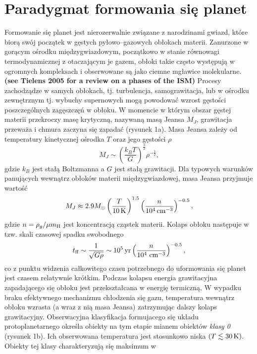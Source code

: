 \section{Paradygmat formowania się planet}
Formowanie się planet jest nierozerwalnie związane z narodzinami gwiazd, które
biorą swój początek w gęstych pyłowo--gazowych obłokach materii. Zanurzone w
gorącym ośrodku międzygwiazdowym, początkowo w stanie równowagi termodynamicznej
z otaczającym je gazem, obłoki takie często występują w
ogromnych kompleksach i obserwowane są jako ciemne mgławice molekularne. {\bf
(see Tielens 2005 for a review on a phases of the ISM)} Procesy zachodządze w
samych obłokach, tj. turbulencja, samograwitacja, lub w ośrodku zewnętrznym tj.
wybuchy supernowych mogą powodować wzrost gęstości poszczególnych zagęszczęń w
obłoku. W momencie w którym obszar gęstej materii przekroczy  masę krytyczną,
nazywaną masą Jeansa $M_J$, grawitacja przeważa i chmura zaczyna się zapadać
(rysunek 1a). Masa Jeansa zależy od temperatury kinetycznej ośrodka $T$ oraz
jego gęstości $\rho$ \begin{equation} M_J \sim \left( \frac{k_B T}{G} \right)
^\frac{3}{2} {\rho}^{-\frac{1}{2}}, \end{equation} gdzie $k_B$ jest stałą
Boltzmanna a $G$ jest stałą grawitacji. Dla typowych warunków panujących
wewnątrz obłoków materii międzygwiazdowej, masa Jeansa przyjmuje wartość
\begin{equation}
 M_J \approx 2.9 M_{\odot} \left(\frac{T}{10\hbox{$\thinspace\textrm{K}$}}\right)^{1.5} 
 \left(\frac{n}{10^4\hbox{$\thinspace\textrm{cm}$}^{-3}}\right)^{-0.5},
\end{equation}
gdzie $n = \rho_g / \mu \hbox{$m_{\textrm{H}}$}$ jest koncentracją cząstek materii.
Kolaps obłoku następuje w tzw. skali czasowej spadku swobodnego
\begin{equation}
   t_{\textrm{ff}} \sim \frac{1}{\sqrt{G\rho}} \sim 10^5\hbox{$\thinspace\textrm{yr}$}
   \left(\frac{n}{10^4\thinspace \hbox{$\thinspace\textrm{cm}$}^{-3}}\right)^{-0.5},
\end{equation}
co z punktu widzenia całkowitego czasu potrzebnego do uformowania się planet
jest czasem relatywnie krótkim. Podczas kolapsu energia
grawitacyjna zapadającego się obłoku jest przekształcana w energię termiczną.  W
wypadku braku efektywnego mechanizmu chłodzenia się gazu, temperatura wewnątrz
obłoku wzrasta (a wraz z nią masa Jeansa) zatrzymując dalszy kolaps
grawitacyjny. Obserwacyjna klasyfikacja formujacego się układu protoplanetarnego
określa obiekty na tym etapie mianem obiektów \emph{klasy 0}~\cite{andre} (rysunek 1b).
Ich obserwowana temperatura jest stosunkowo niska $(T \lesssim
30\hbox{$\thinspace\textrm{K}$})$. Obiekty tej klasy charakteryzują się maksimum w
